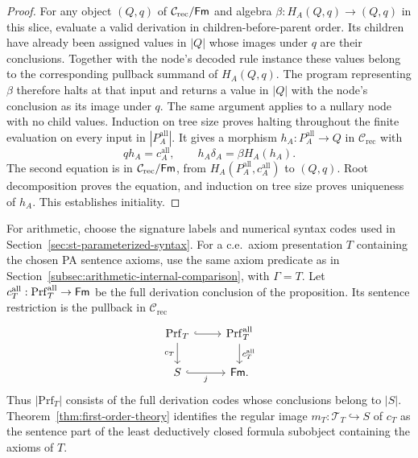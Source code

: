 \begin{proof}
For any object $(Q,q)$ of $\mathcal C_{\mathrm{rec}}/\mathsf{Fm}$ and
algebra $\beta:H_A(Q,q)\to(Q,q)$ in this slice,
evaluate a valid derivation in children-before-parent order.
Its children have already been assigned values in $|Q|$ whose
images under $q$ are their conclusions. Together with the node's
decoded rule instance these values belong to the corresponding pullback
summand of $H_A(Q,q)$. The program representing $\beta$ therefore
halts at that input and returns a value in $|Q|$ with the node's
conclusion as its image under $q$. The same argument applies to
a nullary node with no child values. Induction on tree size proves
halting throughout the finite evaluation on every input in
$|P_A^{\mathrm{all}}|$. It gives a morphism
$h_A:P_A^{\mathrm{all}}\to Q$ in $\mathcal C_{\mathrm{rec}}$ with
\[
 qh_A=c_A^{\mathrm{all}},\qquad
 h_A\delta_A=\beta H_A(h_A).
\]
The second equation is in $\mathcal C_{\mathrm{rec}}/\mathsf{Fm}$, from
$H_A(P_A^{\mathrm{all}},c_A^{\mathrm{all}})$ to $(Q,q)$.
Root decomposition proves the equation, and induction on tree
size proves uniqueness of $h_A$. This establishes initiality.
\end{proof}

For arithmetic, choose the signature labels and numerical
syntax codes used in Section~\ref{sec:st-parameterized-syntax}.
For a c.e.\ axiom presentation $T$ containing the chosen PA sentence
axioms, use the same axiom predicate as in
Section~\ref{subsec:arithmetic-internal-comparison}, with $\Gamma=T$.
Let
$c_T^{\mathrm{all}}:\mathrm{Prf}_T^{\mathrm{all}}\to\mathsf{Fm}$
be the full derivation conclusion of the proposition. Its sentence
restriction is the pullback in $\mathcal C_{\mathrm{rec}}$
\[
\begin{tikzcd}
 \mathrm{Prf}_T\arrow[r,hook]\arrow[d,"c_T"'] &
 \mathrm{Prf}_T^{\mathrm{all}}\arrow[d,"c_T^{\mathrm{all}}"]\\
 S\arrow[r,hook,"j"'] & \Fm.
\end{tikzcd}
\]
Thus $|\mathrm{Prf}_T|$ consists of the full derivation codes whose
conclusions belong to $|S|$. Theorem~\ref{thm:first-order-theory}
identifies the regular image $m_T:\mathcal T_T\hookrightarrow S$
of $c_T$ as the sentence part of the least deductively closed
formula subobject containing the axioms of $T$.

